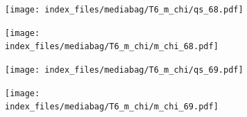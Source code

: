 \documentclass[
  11pt,
  letterpaper,
]{scrreprt}
\begin{document}
\begin{figure}

\begin{minipage}{0.50\linewidth}

\begin{figure}[H]

{\centering \texttt{[image: index\_files/mediabag/T6\_m\_chi/qs\_68.pdf]}

}


\end{figure}%

\end{minipage}%
%
\begin{minipage}{0.50\linewidth}

\begin{figure}[H]

{\centering \texttt{[image: index\_files/mediabag/T6\_m\_chi/m\_chi\_68.pdf]}

}


\end{figure}%

\end{minipage}%

\end{figure}%

\begin{figure}

\begin{minipage}{0.50\linewidth}

\begin{figure}[H]

{\centering \texttt{[image: index\_files/mediabag/T6\_m\_chi/qs\_69.pdf]}

}


\end{figure}%

\end{minipage}%
%
\begin{minipage}{0.50\linewidth}

\begin{figure}[H]

{\centering \texttt{[image: index\_files/mediabag/T6\_m\_chi/m\_chi\_69.pdf]}

}


\end{figure}%

\end{minipage}%

\end{figure}%
\end{document}
